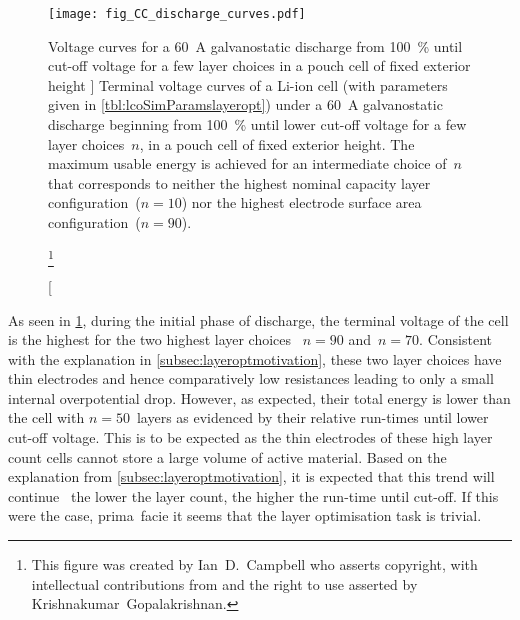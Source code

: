 

\begin{figure}[!bp]
    \begin{minipage}[t]{\textwidth}
        \centering
        \texttt{[image: fig\_CC\_discharge\_curves.pdf]}
        \captionsetup{labelsep=note}
        \caption
        [%
        Voltage curves for a \SI{60}{\ampere} galvanostatic discharge from
        \SI{100}{\percent}  until cut-off voltage for a few layer
        choices in a pouch cell of fixed exterior height
        ]%
        {%
            Terminal voltage curves of a Li-ion cell (with parameters
            given in \cref{tbl:lcoSimParamslayeropt}) under a \SI{60}{\ampere}
            galvanostatic discharge beginning from \SI{100}{\percent}
             until lower cut-off voltage for a few layer
            choices~$n$, in a pouch cell of fixed exterior height. The maximum
            usable energy is achieved for an intermediate choice of~$n$
            that corresponds to neither the highest nominal capacity layer
            configuration~(${n= 10}$) nor the highest electrode surface area
            configuration~(${n = 90}$).
        }%
        \label{fig:fig_CC_discharge_curves}
        \mpfootnotes[1]

        \footnote{This figure was created by \mbox{Ian D.\ Campbell} who asserts copyright,
            with intellectual contributions from and the right to use asserted by
        \mbox{Krishnakumar Gopalakrishnan}.}
    \end{minipage}
\end{figure}

As  seen  in \cref{fig:fig_CC_discharge_curves},  during  the  initial phase  of
discharge, the terminal voltage  of the cell is the highest  for the two highest
layer  choices \ie~${n  =  90}$ and~${n=70}$. Consistent  with  the explanation  in
\cref{subsec:layeroptmotivation}, these  two layer choices have  thin electrodes
and  hence  comparatively low  resistances  leading  to  only a  small  internal
overpotential drop. However,  as expected, their total energy is  lower than the
cell with  ${n=50}$~layers as  evidenced by  their relative run-times  until lower
cut-off voltage.  This is to  be expected as the  thin electrodes of  these high
layer count cells cannot  store a large volume of active  material. Based on the
explanation  from \cref{subsec:layeroptmotivation},  it  is  expected that  this
trend will continue \ie~the lower the layer count, the higher the run-time until
cut-off. If this were the case, prima~facie it seems that the layer optimisation
task is trivial.

